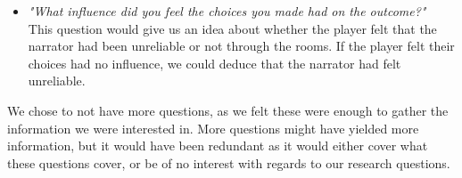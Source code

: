 \begin{itemize}
	\item \textit{"What influence did you feel the choices you made had on the outcome?"} \\
		 This question would give us an idea about whether the player felt that the narrator had been unreliable or not through the rooms. If the player felt their choices had no influence, we could deduce that the narrator had felt unreliable. \\

\end{itemize}

We chose to not have more questions, as we felt these were enough to gather the information we were interested in. More questions might have yielded more information, but it would have been redundant as it would either cover what these questions cover, or be of no interest with regards to our research questions.